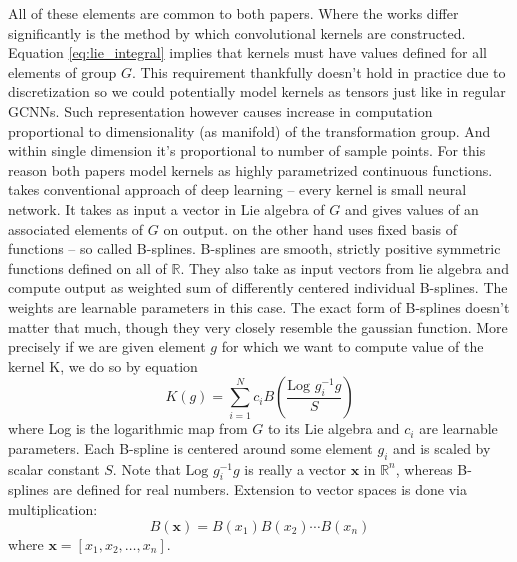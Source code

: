     All of these elements are common to both papers. Where the works
    differ significantly is
    the method by which convolutional kernels are constructed. Equation
    \ref{eq:lie_integral} implies that kernels must have values defined for all
    elements of group $G$. This requirement thankfully doesn't hold in practice
    due to discretization so we could potentially model kernels as tensors just
    like in
    regular GCNNs. Such representation however causes increase
    in computation proportional to dimensionality (as manifold) of the
    transformation group. And within single dimension it's proportional to
    number of sample points. For this reason both papers model kernels as highly
    parametrized continuous functions. \cite{lieconv} takes conventional
    approach of deep learning -- every kernel is small neural network. It takes
    as input a vector in Lie algebra of $G$ and gives values of an associated
    elements of $G$ on output. \cite{bekkers2019} on the other hand uses fixed
    basis of functions -- so called B-splines. B-splines are smooth, strictly positive
    symmetric functions defined on all of $\mathbb{R}$. They also take as input
    vectors from lie algebra and compute output as weighted sum of differently
    centered individual B-splines. The weights are learnable parameters in this
    case. The exact form of B-splines doesn't matter that much, though they very
    closely resemble the gaussian function. More precisely if we are given
    element $g$ for which we want to compute value of the kernel K, we do so by
    equation
    \begin{equation}
        K(g) = \sum_{i=1}^N
        c_i B\left(\frac{\text{Log } g_i^{-1}g}{S}\right)
        \label{eq:bsplines}
    \end{equation}
    where Log is the logarithmic map from $G$ to its Lie algebra and $c_i$ are
    learnable parameters. Each B-spline is
    centered around some element $g_i$ and is scaled by scalar constant $S$. Note that
    $\text{Log } g_i^{-1}g$ is really a vector $\mathbf{x}$ in $\mathbb{R}^n$,
    whereas B-splines are defined for real numbers. Extension to vector spaces
    is done via multiplication:
    \begin{equation}
        B(\mathbf{x}) = B(x_1)B(x_2)\cdots B(x_n)
    \end{equation}
    where $\mathbf{x} = \left[x_1,x_2,\dots,x_n\right]$.












